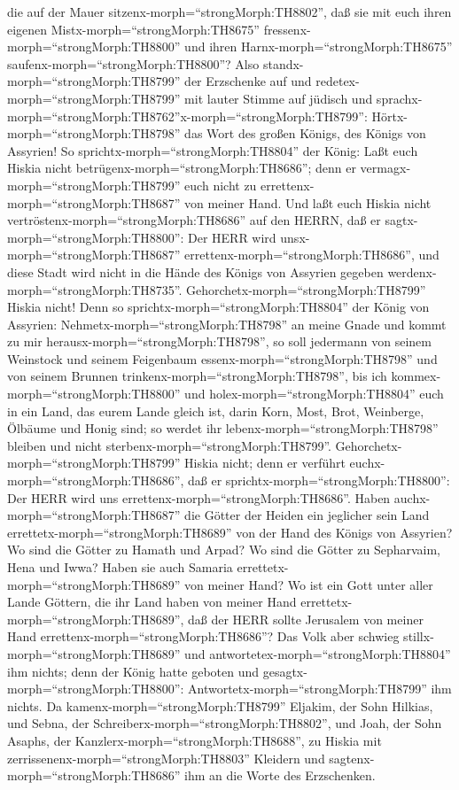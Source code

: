 die auf der Mauer sitzenx-morph=``strongMorph:TH8802'', daß sie mit euch
ihren eigenen Mistx-morph=``strongMorph:TH8675''
fressenx-morph=``strongMorph:TH8800'' und ihren
Harnx-morph=``strongMorph:TH8675'' saufenx-morph=``strongMorph:TH8800''?
 Also standx-morph=``strongMorph:TH8799'' der Erzschenke
auf und redetex-morph=``strongMorph:TH8799'' mit lauter Stimme auf
jüdisch und
sprachx-morph=``strongMorph:TH8762''x-morph=``strongMorph:TH8799'':
Hörtx-morph=``strongMorph:TH8798'' das Wort des großen Königs, des
Königs von Assyrien!  So
sprichtx-morph=``strongMorph:TH8804'' der König: Laßt euch Hiskia nicht
betrügenx-morph=``strongMorph:TH8686''; denn er
vermagx-morph=``strongMorph:TH8799'' euch nicht zu
errettenx-morph=``strongMorph:TH8687'' von meiner Hand. 
Und laßt euch Hiskia nicht vertröstenx-morph=``strongMorph:TH8686'' auf
den HERRN, daß er sagtx-morph=``strongMorph:TH8800'': Der HERR wird
unsx-morph=``strongMorph:TH8687''
errettenx-morph=``strongMorph:TH8686'', und diese Stadt wird nicht in
die Hände des Königs von Assyrien gegeben
werdenx-morph=``strongMorph:TH8735''. 
Gehorchetx-morph=``strongMorph:TH8799'' Hiskia nicht! Denn so
sprichtx-morph=``strongMorph:TH8804'' der König von Assyrien:
Nehmetx-morph=``strongMorph:TH8798'' an meine Gnade und kommt zu mir
herausx-morph=``strongMorph:TH8798'', so soll jedermann von seinem
Weinstock und seinem Feigenbaum essenx-morph=``strongMorph:TH8798'' und
von seinem Brunnen trinkenx-morph=``strongMorph:TH8798'', 
bis ich kommex-morph=``strongMorph:TH8800'' und
holex-morph=``strongMorph:TH8804'' euch in ein Land, das eurem Lande
gleich ist, darin Korn, Most, Brot, Weinberge, Ölbäume und Honig sind;
so werdet ihr lebenx-morph=``strongMorph:TH8798'' bleiben und nicht
sterbenx-morph=``strongMorph:TH8799''.
Gehorchetx-morph=``strongMorph:TH8799'' Hiskia nicht; denn er verführt
euchx-morph=``strongMorph:TH8686'', daß er
sprichtx-morph=``strongMorph:TH8800'': Der HERR wird uns
errettenx-morph=``strongMorph:TH8686''.  Haben
auchx-morph=``strongMorph:TH8687'' die Götter der Heiden ein jeglicher
sein Land errettetx-morph=``strongMorph:TH8689'' von der Hand des Königs
von Assyrien?  Wo sind die Götter zu Hamath und Arpad? Wo
sind die Götter zu Sepharvaim, Hena und Iwwa? Haben sie auch Samaria
errettetx-morph=``strongMorph:TH8689'' von meiner Hand?  Wo
ist ein Gott unter aller Lande Göttern, die ihr Land haben von meiner
Hand errettetx-morph=``strongMorph:TH8689'', daß der HERR sollte
Jerusalem von meiner Hand errettenx-morph=``strongMorph:TH8686''?
 Das Volk aber schwieg stillx-morph=``strongMorph:TH8689''
und antwortetex-morph=``strongMorph:TH8804'' ihm nichts; denn der König
hatte geboten und gesagtx-morph=``strongMorph:TH8800'':
Antwortetx-morph=``strongMorph:TH8799'' ihm nichts.  Da
kamenx-morph=``strongMorph:TH8799'' Eljakim, der Sohn Hilkias, und
Sebna, der Schreiberx-morph=``strongMorph:TH8802'', und Joah, der Sohn
Asaphs, der Kanzlerx-morph=``strongMorph:TH8688'', zu Hiskia mit
zerrissenenx-morph=``strongMorph:TH8803'' Kleidern und
sagtenx-morph=``strongMorph:TH8686'' ihm an die Worte des Erzschenken.

